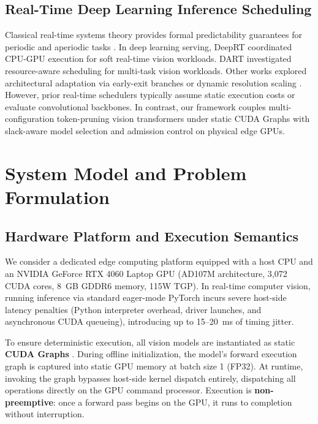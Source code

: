 \documentclass[conference]{IEEEtran}
\begin{document}
\subsection{Real-Time Deep Learning Inference Scheduling}
Classical real-time systems theory provides formal predictability guarantees for periodic and aperiodic tasks \cite{buttazzo2011hard}. In deep learning serving, DeepRT \cite{zhang2021deeprt} coordinated CPU-GPU execution for soft real-time vision workloads. DART \cite{le2022dart} investigated resource-aware scheduling for multi-task vision workloads. Other works explored architectural adaptation via early-exit branches \cite{teerapittayanon2016branchynet} or dynamic resolution scaling \cite{yang2020resolution}. However, prior real-time schedulers typically assume static execution costs or evaluate convolutional backbones. In contrast, our framework couples multi-configuration token-pruning vision transformers under static CUDA Graphs with slack-aware model selection and admission control on physical edge GPUs.

\section{System Model and Problem Formulation}

\subsection{Hardware Platform and Execution Semantics}
We consider a dedicated edge computing platform equipped with a host CPU and an NVIDIA GeForce RTX 4060 Laptop GPU (AD107M architecture, 3,072 CUDA cores, 8~GB GDDR6 memory, 115W TGP). In real-time computer vision, running inference via standard eager-mode PyTorch incurs severe host-side latency penalties (Python interpreter overhead, driver launches, and asynchronous CUDA queueing), introducing up to 15--20~ms of timing jitter.

To ensure deterministic execution, all vision models are instantiated as static \textbf{CUDA Graphs} \cite{nvidia2023cudagraphs}. During offline initialization, the model's forward execution graph is captured into static GPU memory at batch size 1 (FP32). At runtime, invoking the graph bypasses host-side kernel dispatch entirely, dispatching all operations directly on the GPU command processor. Execution is \textbf{non-preemptive}: once a forward pass begins on the GPU, it runs to completion without interruption.
\end{document}
